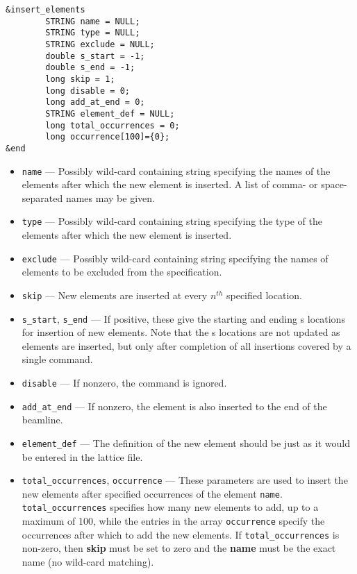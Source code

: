 \documentclass[11pt]{article}
\begin{document}
\begin{verbatim}
&insert_elements
        STRING name = NULL;
        STRING type = NULL;
        STRING exclude = NULL;
        double s_start = -1;
        double s_end = -1;
        long skip = 1;
        long disable = 0;
        long add_at_end = 0;
        STRING element_def = NULL;
        long total_occurrences = 0;
        long occurrence[100]={0};
&end
\end{verbatim}

\begin{itemize}
\item \verb|name| --- Possibly wild-card containing string specifying the
   names of the elements after which the new element is inserted. A list of comma- or space-separated names may be given.
\item \verb|type| --- Possibly wild-card containing string specifying the
   type of the elements after which the new element is inserted.
\item \verb|exclude| --- Possibly wild-card containing string specifying 
   the names of elements to be excluded from the specification.
\item \verb|skip| --- New elements are inserted at every $n^{th}$ specified location.
\item \verb|s_start|, \verb|s_end| --- If positive, these give the starting and ending s locations for insertion of new elements.
  Note that the s locations are not updated as elements are inserted, but only after completion of all insertions covered by
  a single command.
\item \verb|disable| --- If nonzero, the command is ignored.
\item \verb|add_at_end| --- If nonzero, the element is also inserted to the end of the beamline.
\item \verb|element_def| --- The definition of the new element should be just as it would be entered in 
the lattice file.
\item \verb|total_occurrences|, \verb|occurrence| --- 
These parameters are used to insert the new elements after specified occurrences of 
the element \verb|name|.  \verb|total_occurrences| specifies how many new elements to add,
up to a maximum of 100, while the entries in the array \verb|occurrence| specify the occurrences
after which to add the new elements. If \verb|total_occurrences| is non-zero, then {\bf skip} must
be set to zero  and the {\bf name} must be the exact name (no wild-card matching). 
\end{itemize}
\end{document}
